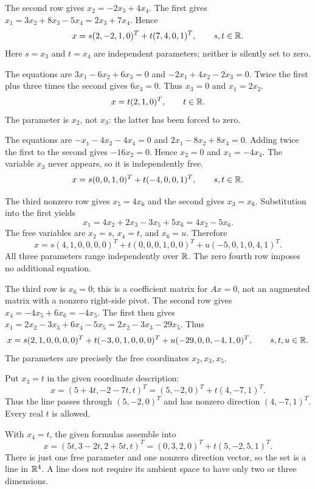 The second row gives $x_2=-2x_3+4x_4$. The first gives
$x_1=3x_2+8x_3-5x_4=2x_3+7x_4$. Hence
\[x=s(2,-2,1,0)^T+t(7,4,0,1)^T,\qquad s,t\in\mathbb{R}.\]
Here $s=x_3$ and $t=x_4$ are independent parameters; neither is
silently set to zero.

The equations are $3x_1-6x_2+6x_3=0$ and
$-2x_1+4x_2-2x_3=0$. Twice the first plus three times the second
gives $6x_3=0$. Thus $x_3=0$ and $x_1=2x_2$.
\[x=t(2,1,0)^T,\qquad t\in\mathbb{R}.\]
The parameter is $x_2$, not $x_3$: the latter has been forced to zero.

The equations are $-x_1-4x_2-4x_4=0$ and
$2x_1-8x_2+8x_4=0$. Adding twice the first to the second gives
$-16x_2=0$. Hence $x_2=0$ and $x_1=-4x_4$.
The variable $x_3$ never appears, so it is independently free.
\[x=s(0,0,1,0)^T+t(-4,0,0,1)^T,\qquad s,t\in\mathbb{R}.\]

The third nonzero row gives $x_5=4x_6$ and the second gives
$x_3=x_6$. Substitution into the first yields
\[x_1=4x_2+2x_3-3x_5+5x_6=4x_2-5x_6.\]
The free variables are $x_2=s$, $x_4=t$, and $x_6=u$. Therefore
\[x=s(4,1,0,0,0,0)^T+t(0,0,0,1,0,0)^T
+u(-5,0,1,0,4,1)^T.\]
All three parameters range independently over $\mathbb{R}$. The zero fourth
row imposes no additional equation.

The third row is $x_6=0$; this is a coefficient matrix for $Ax=0$,
not an augmented matrix with a nonzero right-side pivot.
The second row gives $x_4=-4x_5+6x_6=-4x_5$.
The first then gives
$x_1=2x_2-3x_3+6x_4-5x_5=2x_2-3x_3-29x_5$.
Thus
\[x=s(2,1,0,0,0,0)^T+t(-3,0,1,0,0,0)^T
+u(-29,0,0,-4,1,0)^T,\qquad s,t,u\in\mathbb{R}.\]
The parameters are precisely the free coordinates $x_2,x_3,x_5$.

Put $x_3=t$ in the given coordinate description:
\[x=(5+4t,-2-7t,t)^T=(5,-2,0)^T+t(4,-7,1)^T.\]
Thus the line passes through $(5,-2,0)^T$ and has nonzero direction
$(4,-7,1)^T$. Every real $t$ is allowed.

With $x_4=t$, the given formulas assemble into
\[x=(5t,3-2t,2+5t,t)^T
=(0,3,2,0)^T+t(5,-2,5,1)^T.\]
There is just one free parameter and one nonzero direction vector,
so the set is a line in $\mathbb{R}^4$. A line does not require its ambient
space to have only two or three dimensions.

